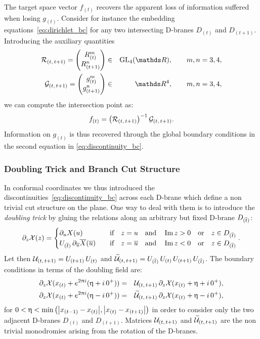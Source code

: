 The target space vector $f_{(t)}$ recovers the apparent loss of information suffered when losing $g_{(t)}$.
Consider for instance the embedding equations~\eqref{eq:dirichlet_bc} for any two intersecting D-branes $D_{(t)}$ and $D_{(t+1)}$.
Introducing the auxiliary quantities
\begin{eqnarray}
  \cR_{(t,\, t+1)}
  =
  \mqty( R_{(t)}^m \\ R_{(t+1)}^n )
  & \in &
  \GL{4}{\R},
  \qquad
  m, n = 3, 4,
  \\
  \cG_{(t,\, t+1)}
  =
  \mqty( g_{(t)}^m \\ g_{(t+1)}^n )
  & \in &
  \R^4,
  \qquad
  m, n = 3, 4,
\end{eqnarray}
we can compute the intersection point as:
\begin{equation}
  f_{(t)}
  =
  \qty( \mathcal{R}_{(t,\, t+1)} )^{-1}\,
  \mathcal{G}_{(t,\, t+1)}.
\end{equation}
Information on $g_{(t)}$ is thus recovered through the global boundary conditions in the second equation in \eqref{eq:discontinuity_bc}.


\subsubsection{Doubling Trick and Branch Cut Structure}

In conformal coordinates we thus introduced the discontinuities~\eqref{eq:discontinuity_bc} across each D-brane which define a non trivial cut structure on the plane.
One way to deal with them is to introduce the \emph{doubling trick} by gluing the relations along an arbitrary but fixed D-brane $D_{(\overline{t})}$:
\begin{equation}
  \ipd{z} \cX(z) =
  \begin{cases}
    \ipd{u} X(u)
    &
    \qif
    z = u \qand \Im z > 0 \qor z \in D_{(\bart)}
    \\
    U_{(\bart)}\,
    \ipd{\baru} \barX(\baru)
    & \qif z = \baru \qand \Im z < 0 \qor z \in D_{(\bart)}
  \end{cases}.
  \label{eq:real_doubling_trick}
\end{equation}
Let then $\mathcal{U}_{(t,\, t+1)} = U_{(t+1)}\, U_{(t)}$ and $\widetilde{\mathcal{U}}_{(t,\, t+1)} = U_{(\overline{t})}\, U_{(t)}\, U_{(t+1)}\, U_{(\overline{t})}$.
The boundary conditions in terms of the doubling field are:
\begin{eqnarray}
  \partial_{z} \mathcal{X}( x_{(t)} + e^{2 \uppi i}( \upeta + i\, 0^+ ) )
  & = &
  \mathcal{U}_{(t,\, t+1)}\,
  \partial_{z} \mathcal{X}( x_{(t)} + \upeta + i\, 0^+ ),
  \label{eq:top_monodromy}
  \\
  \partial_{z} \mathcal{X}( x_{(t)} + e^{2 \uppi i}( \upeta - i\, 0^+ ) )
  & = &
  \widetilde{\mathcal{U}}_{(t,\, t+1)}\,
  \partial_{z} \mathcal{X}( x_{(t)} + \upeta - i\, 0^+ ),
  \label{eq:bottom_monodromy}
\end{eqnarray}
for $0 < \upeta < \min\qty( \abs{x_{(t-1)} - x_{(t)}}, \abs{x_{(t)} - x_{(t+1)}} )$ in order to consider only the two adjacent D-branes $D_{(t)}$ and $D_{(t+1)}$.
Matrices $\mathcal{U}_{(t,\, t+1)}$ and $\widetilde{\mathcal{U}}_{(t,\, t+1)}$ are the non trivial monodromies arising from the rotation of the D-branes.

